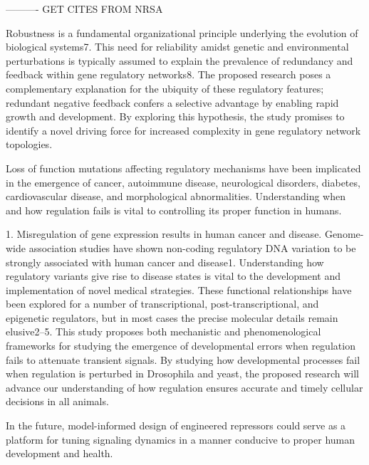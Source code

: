 ---------- GET CITES FROM NRSA

Robustness is a fundamental organizational principle underlying the evolution of biological systems7. This need for reliability amidst genetic and environmental perturbations is typically assumed to explain the prevalence of redundancy and feedback within gene regulatory networks8. The proposed research poses a complementary explanation for the ubiquity of these regulatory features; redundant negative feedback confers a selective advantage by enabling rapid growth and development. By exploring this hypothesis, the study promises to identify a novel driving force for increased complexity in gene regulatory network topologies. 



Loss of function mutations affecting regulatory mechanisms have been implicated in the emergence of cancer, autoimmune disease, neurological disorders, diabetes, cardiovascular disease, and morphological abnormalities. Understanding when and how regulation fails is vital to controlling its proper function in humans.

1.	Misregulation of gene expression results in human cancer and disease. Genome-wide association studies have shown non-coding regulatory DNA variation to be strongly associated with human cancer and disease1. Understanding how regulatory variants give rise to disease states is vital to the development and implementation of novel medical strategies. These functional relationships have been explored for a number of transcriptional, post-transcriptional, and epigenetic regulators, but in most cases the precise molecular details remain elusive2–5. This study proposes both mechanistic and phenomenological frameworks for studying the emergence of developmental errors when regulation fails to attenuate transient signals. By studying how developmental processes fail when regulation is perturbed in Drosophila and yeast, the proposed research will advance our understanding of how regulation ensures accurate and timely cellular decisions in all animals.  

In the future, model-informed design of engineered repressors could serve as a platform for tuning signaling dynamics in a manner conducive to proper human development and health.

